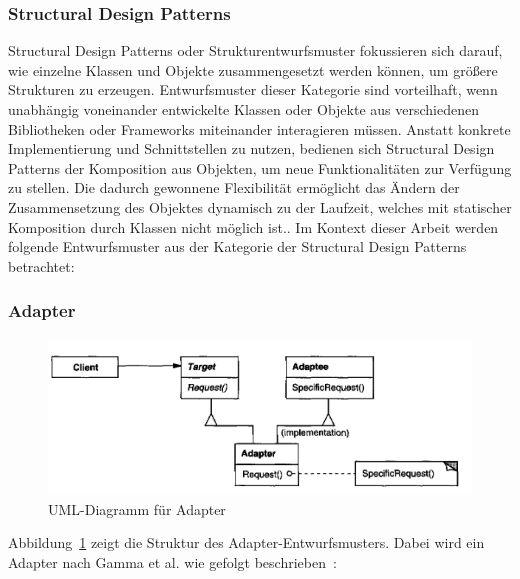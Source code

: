 \subsubsection{Structural Design Patterns}

Structural Design Patterns oder Strukturentwurfsmuster fokussieren sich darauf, wie einzelne Klassen und Objekte zusammengesetzt werden können, um größere Strukturen zu erzeugen\cite[S. 137]{gamma1994design}.
Entwurfsmuster dieser Kategorie sind vorteilhaft, wenn unabhängig voneinander entwickelte Klassen oder Objekte aus verschiedenen Bibliotheken oder Frameworks miteinander interagieren müssen.
Anstatt konkrete Implementierung und Schnittstellen zu nutzen, bedienen sich Structural Design Patterns der Komposition aus Objekten, um neue Funktionalitäten zur Verfügung zu stellen\cite[S. 137]{gamma1994design}.
Die dadurch gewonnene Flexibilität ermöglicht das Ändern der Zusammensetzung des Objektes dynamisch zu der Laufzeit, welches mit statischer Komposition durch Klassen nicht möglich ist.\cite[S. 137]{gamma1994design}.
Im Kontext dieser Arbeit werden folgende Entwurfsmuster aus der Kategorie der Structural Design Patterns betrachtet:

\subsubsection{Adapter}

\begin{figure}[h]
    \centering
    \includegraphics[scale=0.75]{figures/adapter.png}
    \caption{UML-Diagramm für Adapter}
    \label{fig:adapter}
\end{figure}

Abbildung~\ref{fig:adapter} zeigt die Struktur des Adapter-Entwurfsmusters. 
Dabei wird ein Adapter nach Gamma et al. wie gefolgt beschrieben~\cite[S. 141]{gamma1994design}:


